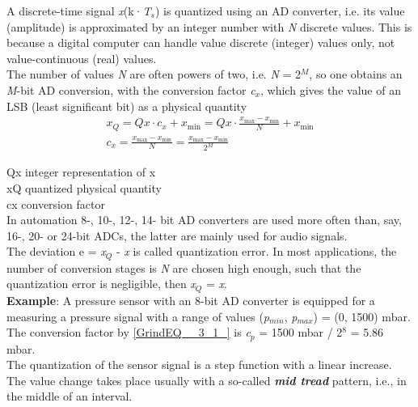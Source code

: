 A discrete-time signal \textit{x}(k·\textit{T${}_{s}$}) is quantized using an AD converter, i.e. its value (amplitude) is approximated by an integer number with \textit{N} discrete values. This is because a digital computer can handle value discrete (integer) values only, not value-continuous (real) values.\\

The number of values \textit{N} are often powers of two, i.e. \textit{N} = 2\textit{${}^{M}$}, so one obtains an \textit{M}-bit AD conversion, with the conversion factor \textit{c${}_{x}$}, which gives the value of an LSB (least significant bit) as a physical quantity\\

\begin{equation}
	\begin{array}{l} {x_{Q} =Qx\cdot c_{x} +x_{\min } =Qx\cdot \frac{x_{\max } -x_{\min } }{N} +x_{\min } } \\
	
	 {c_{x} =\frac{x_{\max } -x_{\min } }{N} =\frac{x_{\max } -x_{\min } }{2^{M} } } \end{array}
\label{EQ }
\end{equation}

Qx	integer representation of x\\
xQ	quantized physical quantity\\
cx	conversion factor\\

In automation 8-, 10-, 12-, 14- bit AD converters are used more often than, say, 16-, 20- or 24-bit ADCs, the latter are mainly used for audio signals.\\

The deviation e = \textit{x${}_{Q}$} - \textit{x} is called quantization error. In most applications, the number of conversion stages is \textit{N} are chosen high enough, such that the quantization error is negligible, then \textit{x${}_{Q}$} = \textit{x}.\\

\textbf{Example}: A pressure sensor with an 8-bit AD converter is equipped for a measuring a pressure signal with a range of values (\textit{p${}_{min}$}, \textit{p${}_{max}$}) = (0, 1500) mbar.\\

The conversion factor by \eqref{GrindEQ__3_1_} is \textit{c${}_{p}$} = 1500 mbar / 2${}^{8}$ = 5.86 mbar.\\

The quantization of the sensor signal is a step function with a linear increase. The value change takes place usually with a so-called \textbf{\textit{mid tread}} pattern, i.e., in the middle of an interval.\\

